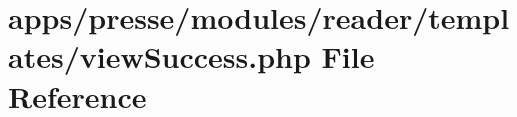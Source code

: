 \hypertarget{presse_2modules_2reader_2templates_2view_success_8php}{\section{apps/presse/modules/reader/templates/view\-Success.php File Reference}
\label{presse_2modules_2reader_2templates_2view_success_8php}
}

